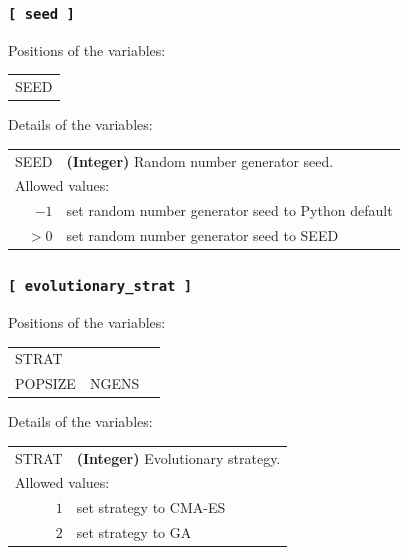 \documentclass[10pt,a4paper,openany]{memoir}
\numberwithin{equation}{section}
\begin{document}
\subsubsection{\texttt{[~seed~]}}
\label{sec:inp-seed}

Positions of the variables:
\begin{center}
  \begin{tabular}{l}
    SEED
  \end{tabular}
\end{center}

\noindent Details of the variables:
\vspace{2ex}

{
\begin{tabular}{r@{ : }l}
\label{descr:seed}
      SEED&\textbf{(Integer)} Random number generator seed.                                                                        \\ 
\multicolumn{2}{l}{Allowed values:} \\ 
    \(-1\)&set random number generator seed to Python default                                                  \\ 
    \(>0\)&set random number generator seed to SEED                                                             \\ 
\end{tabular}
\vspace{1ex}
}

\subsubsection{\texttt{[~evolutionary\_strat~]}}
\label{sec:inp-ga}

Positions of the variables:
\begin{center}
  \begin{tabular}{lll}
    STRAT & \\
    POPSIZE & NGENS & \\
  \end{tabular}
\end{center}

\noindent Details of the variables:
\vspace{2ex}

{
\begin{tabular}{r@{ : }l}
\label{descr:strat}
   STRAT &\textbf{(Integer)} Evolutionary strategy.                                                                           \\ 
\multicolumn{2}{l}{Allowed values:} \\ 
    \(1\)&set strategy to CMA-ES                                                                       \\ 
    \(2\)&set strategy to GA                                                                       \\ 
\end{tabular}
\vspace{1ex}
}
\end{document}
